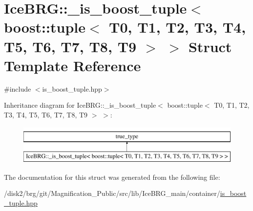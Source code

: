 \hypertarget{structIceBRG_1_1__is__boost__tuple_3_01boost_1_1tuple_3_01T0_00_01T1_00_01T2_00_01T3_00_01T4_00_aeaacd25f11a77396b5b6e53a5953fba}{}\section{Ice\+B\+R\+G\+:\+:\+\_\+is\+\_\+boost\+\_\+tuple$<$ boost\+:\+:tuple$<$ T0, T1, T2, T3, T4, T5, T6, T7, T8, T9 $>$ $>$ Struct Template Reference}
\label{structIceBRG_1_1__is__boost__tuple_3_01boost_1_1tuple_3_01T0_00_01T1_00_01T2_00_01T3_00_01T4_00_aeaacd25f11a77396b5b6e53a5953fba}


{\ttfamily \#include $<$is\+\_\+boost\+\_\+tuple.\+hpp$>$}

Inheritance diagram for Ice\+B\+R\+G\+:\+:\+\_\+is\+\_\+boost\+\_\+tuple$<$ boost\+:\+:tuple$<$ T0, T1, T2, T3, T4, T5, T6, T7, T8, T9 $>$ $>$\+:\begin{figure}[H]
\begin{center}
\leavevmode
\includegraphics[height=2.000000cm]{structIceBRG_1_1__is__boost__tuple_3_01boost_1_1tuple_3_01T0_00_01T1_00_01T2_00_01T3_00_01T4_00_aeaacd25f11a77396b5b6e53a5953fba}
\end{center}
\end{figure}


The documentation for this struct was generated from the following file\+:\begin{DoxyCompactItemize}
\item 
/disk2/brg/git/\+Magnification\+\_\+\+Public/src/lib/\+Ice\+B\+R\+G\+\_\+main/container/\hyperlink{is__boost__tuple_8hpp}{is\+\_\+boost\+\_\+tuple.\+hpp}\end{DoxyCompactItemize}
